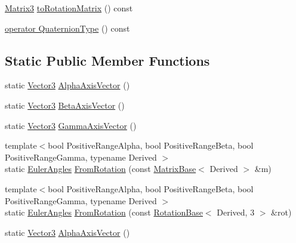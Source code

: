 \begin{DoxyCompactItemize}
\item 
\hyperlink{class_eigen_1_1_euler_angles_ad0f0ee8240849b0f7d028695849cdbad}{Matrix3} \hyperlink{class_eigen_1_1_euler_angles_a11ec16b3ed918fac62d295012ec4e2ac}{to\+Rotation\+Matrix} () const
\item 
\hyperlink{class_eigen_1_1_euler_angles_aa4ccd4b412c3146a9dd58a884eaea42e}{operator Quaternion\+Type} () const
\end{DoxyCompactItemize}
\subsection*{Static Public Member Functions}
\begin{DoxyCompactItemize}
\item 
static \hyperlink{class_eigen_1_1_euler_angles_af0f446aa0f46b3439abedff63fabf39c}{Vector3} \hyperlink{class_eigen_1_1_euler_angles_a33d034ea7e8cac1f4d7c329d741b9a59}{Alpha\+Axis\+Vector} ()
\item 
static \hyperlink{class_eigen_1_1_euler_angles_af0f446aa0f46b3439abedff63fabf39c}{Vector3} \hyperlink{class_eigen_1_1_euler_angles_aede24ef1ffc5913f2eb6539c1f1b9dc4}{Beta\+Axis\+Vector} ()
\item 
static \hyperlink{class_eigen_1_1_euler_angles_af0f446aa0f46b3439abedff63fabf39c}{Vector3} \hyperlink{class_eigen_1_1_euler_angles_a77ea78dac1d599353e2a87d95cc6f1d4}{Gamma\+Axis\+Vector} ()
\item 
{\footnotesize template$<$bool Positive\+Range\+Alpha, bool Positive\+Range\+Beta, bool Positive\+Range\+Gamma, typename Derived $>$ }\\static \hyperlink{class_eigen_1_1_euler_angles}{Euler\+Angles} \hyperlink{class_eigen_1_1_euler_angles_accbaa67f736f1883641f70994ffc7284}{From\+Rotation} (const \hyperlink{group___core___module_class_eigen_1_1_matrix_base}{Matrix\+Base}$<$ Derived $>$ \&m)
\item 
{\footnotesize template$<$bool Positive\+Range\+Alpha, bool Positive\+Range\+Beta, bool Positive\+Range\+Gamma, typename Derived $>$ }\\static \hyperlink{class_eigen_1_1_euler_angles}{Euler\+Angles} \hyperlink{class_eigen_1_1_euler_angles_aec5a08ed94b3574402d99850d766d18a}{From\+Rotation} (const \hyperlink{class_eigen_1_1_rotation_base}{Rotation\+Base}$<$ Derived, 3 $>$ \&rot)
\item 
static \hyperlink{class_eigen_1_1_euler_angles_af0f446aa0f46b3439abedff63fabf39c}{Vector3} \hyperlink{class_eigen_1_1_euler_angles_a33d034ea7e8cac1f4d7c329d741b9a59}{Alpha\+Axis\+Vector} ()

\end{DoxyCompactItemize}
